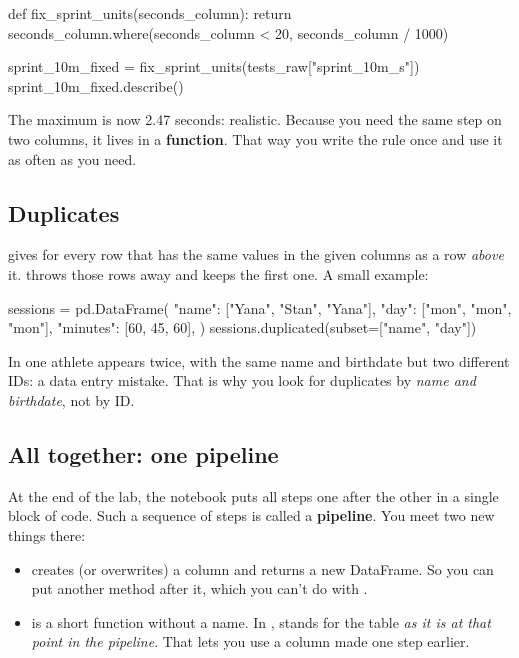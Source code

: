 \documentclass[11pt,a4paper]{article}
\begin{document}
\begin{python}
def fix_sprint_units(seconds_column):
    return seconds_column.where(seconds_column < 20, seconds_column / 1000)

sprint_10m_fixed = fix_sprint_units(tests_raw["sprint_10m_s"])
sprint_10m_fixed.describe()
\end{python}

The maximum is now 2.47 seconds: realistic. Because you need the same
step on two columns, it lives in a \textbf{function}. That way you write
the rule once and use it as often as you need.

\subsection{Duplicates}

 gives  for every row that has
the same values in the given columns as a row \emph{above} it.
 throws those rows
away and keeps the first one. A small example:

\begin{python}
sessions = pd.DataFrame({
    "name": ["Yana", "Stan", "Yana"],
    "day": ["mon", "mon", "mon"],
    "minutes": [60, 45, 60],
})
sessions.duplicated(subset=["name", "day"])
\end{python}

In  one athlete appears twice, with the same name and
birthdate but two different IDs: a data entry mistake. That is why you
look for duplicates by \emph{name and birthdate}, not by ID.

\subsection{All together: one pipeline}

At the end of the lab, the notebook puts all steps one after the other
in a single block of code. Such a sequence of steps is called a
\textbf{pipeline}. You meet two new things there:

\begin{itemize}
  \item {} creates (or overwrites) a column and
        returns a new DataFrame. So you can put another method after it,
        which you can't do with .
  \item {} is a short function without a name. In
        , 
        stands for the table \emph{as it is at that point in the
        pipeline}. That lets you use a column made one step earlier.
\end{itemize}
\end{document}

